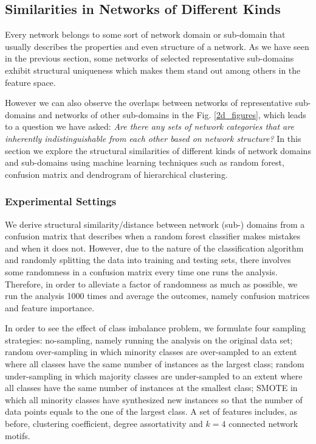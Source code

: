 \documentclass{article}
\begin{document}
\subsection{Similarities in Networks of Different Kinds}
Every network belongs to some sort of network domain or sub-domain that usually describes the properties and even structure of a network. As we have seen in the previous section, some networks of selected representative sub-domains exhibit structural uniqueness which makes them stand out among others in the feature space.

However we can also observe the overlaps between networks of representative sub-domains and networks of other sub-domains in the Fig. \ref{2d_figures}, which leads to a question we have asked:  \textit{Are there any sets of network categories that are inherently indistinguishable from each other based on network structure?} In this section we explore the structural similarities of different kinds of network domains and sub-domains using machine learning techniques such as random forest, confusion matrix and dendrogram of hierarchical clustering.  

\subsubsection{Experimental Settings}
We derive structural similarity/distance between network (sub-) domains from a confusion matrix that describes when a random forest classifier makes mistakes and when it does not. However, due to the nature of the classification algorithm and randomly splitting the data into training and testing sets, there involves some randomness in a confusion matrix every time one runs the analysis. Therefore, in order to alleviate a factor of randomness as much as possible, we run the analysis 1000 times and average the outcomes, namely confusion matrices and feature importance. 

In order to see the effect of class imbalance problem, we formulate four sampling strategies: no-sampling, namely running the analysis on the original data set; random over-sampling in which minority classes are over-sampled to an extent where all classes have the same number of instances as the largest class; random under-sampling in which majority classes are under-sampled to an extent where all classes have the same number of instances at the smallest class; SMOTE in which all minority classes have synthesized new instances so that the number of data points equals to the one of the largest class. A set of features includes, as before, clustering coefficient, degree assortativity and $k = 4$ connected network motifs.
 
\end{document}
